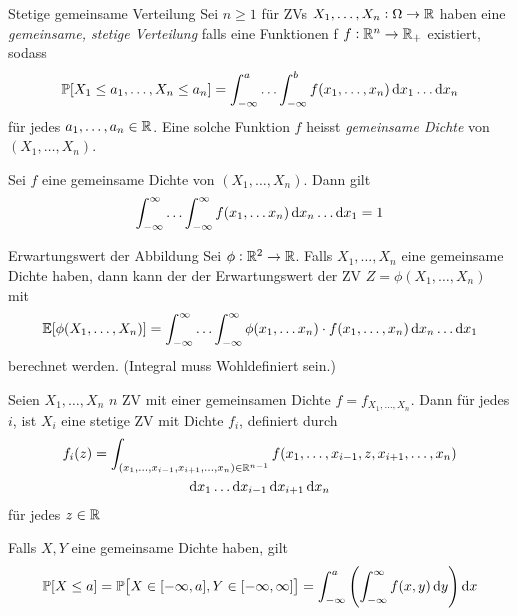 \begin{definition}{Stetige gemeinsame Verteilung}
	Sei $n \geq 1$ für ZVs $X_1 , \ldots , X_n : \Omega \rightarrow \mathbb{R}$ haben eine \emph{gemeinsame, stetige Verteilung
} falls eine Funktionen f $f : \mathbb{R}^n \rightarrow \mathbb{R}_+$ existiert, sodass
	\begin{equation*}
		\pr [X_1 \leq a_1, \ldots , X_n \leq a_n] = \int_{-\infty}^{a} \ldots \int_{- \infty}^{b} f(x_1 ,\ldots , x_n)
		\dif x_1 \ldots \dif x_n
	\end{equation*}
	für jedes $a_1 , \ldots , a_n \in \mathbb{R}$. Eine solche Funktion $f$ heisst \emph{gemeinsame Dichte} von $(X_1 , \ldots ,
	X_n)$.
\end{definition}
\begin{prop}
	Sei $f$ eine gemeinsame Dichte von $(X_1, \ldots , X_n)$. Dann gilt
	\begin{equation*}
		\int_{-\infty}^{\infty} \ldots \int_{-\infty}^{\infty} f(x_1, \ldots x_n) \dif x_n \ldots \dif x_1 = 1
	\end{equation*}
\end{prop}
\begin{tprop}{Erwartungswert der Abbildung}
	Sei $\phi : \mathbb{R}^2 \rightarrow \mathbb{R}$. Falls $X_1, \ldots , X_n$ eine gemeinsame Dichte haben, dann kann der der Erwartungswert der ZV $Z =
	\phi (X_1 , \ldots , X_n)$ mit
	\begin{equation*}
		\E [\phi (X_1, \ldots , X_n)] = \int_{-\infty}^{\infty} \ldots \int_{-\infty}^{\infty} \phi(x_1, \ldots x_n) \cdot
		f(x_1, \ldots , x_n) \dif x_n \ldots \dif x_1
	\end{equation*}
	berechnet werden. (Integral muss Wohldefiniert sein.)
\end{tprop}
\begin{prop}
	Seien $X_1 , \ldots , X_n$ $n$ ZV mit einer gemeinsamen Dichte $f = f_{X_1 , \ldots , X_n}$. Dann für jedes $i$, ist
	$X_i$ eine stetige ZV mit Dichte $f_i$, definiert durch
	\begin{gather*}
		f_i(z) = \int_{(x_1 , \ldots , x_{i-1}, x_{i+1}, \ldots , x_n) \in \R^{n-1}} f (x_1 , \ldots , x_{i-1}, z,
		x_{i+1}, \ldots , x_n)\\
		\dif x_1 \ldots \dif x_{i-1} \dif x_{i+1} \dif x_n 
	\end{gather*}
	für jedes $z \in \mathbb{R}$
\end{prop}
Falls $X,Y$ eine gemeinsame Dichte haben, gilt 
\begin{equation*}
	\pr [X \leq a] = \pr \big[ X \in [-\infty,a], Y \in [-\infty,\infty]\big] = \int_{-\infty}^{a} \left(
	\int_{-\infty}^{\infty} f(x,y) \dif y \right) \dif x
\end{equation*}
